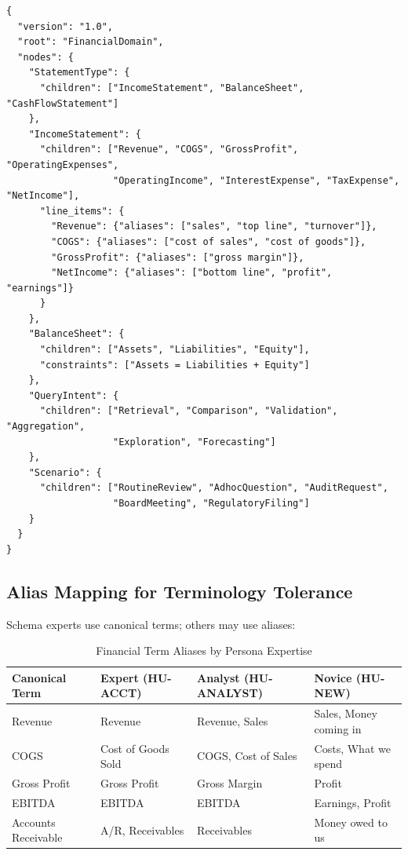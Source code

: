 \begin{lstlisting}[language=jsonx,caption={Financial domain taxonomy (JSON)}]
{
  "version": "1.0",
  "root": "FinancialDomain",
  "nodes": {
    "StatementType": {
      "children": ["IncomeStatement", "BalanceSheet", "CashFlowStatement"]
    },
    "IncomeStatement": {
      "children": ["Revenue", "COGS", "GrossProfit", "OperatingExpenses", 
                   "OperatingIncome", "InterestExpense", "TaxExpense", "NetIncome"],
      "line_items": {
        "Revenue": {"aliases": ["sales", "top line", "turnover"]},
        "COGS": {"aliases": ["cost of sales", "cost of goods"]},
        "GrossProfit": {"aliases": ["gross margin"]},
        "NetIncome": {"aliases": ["bottom line", "profit", "earnings"]}
      }
    },
    "BalanceSheet": {
      "children": ["Assets", "Liabilities", "Equity"],
      "constraints": ["Assets = Liabilities + Equity"]
    },
    "QueryIntent": {
      "children": ["Retrieval", "Comparison", "Validation", "Aggregation", 
                   "Exploration", "Forecasting"]
    },
    "Scenario": {
      "children": ["RoutineReview", "AdhocQuestion", "AuditRequest", 
                   "BoardMeeting", "RegulatoryFiling"]
    }
  }
}
\end{lstlisting}

\subsection{Alias Mapping for Terminology Tolerance}

Schema experts use canonical terms; others may use aliases:

\begin{table}[htbp]
\centering
\footnotesize
\caption{Financial Term Aliases by Persona Expertise}
\label{tab:term-aliases}
\begin{tabularx}{\textwidth}{@{}l l l l@{}}
\toprule
\textbf{Canonical Term} & \textbf{Expert (HU-ACCT)} & \textbf{Analyst (HU-ANALYST)} & \textbf{Novice (HU-NEW)} \\
\midrule
Revenue & Revenue & Revenue, Sales & Sales, Money coming in \\
COGS & Cost of Goods Sold & COGS, Cost of Sales & Costs, What we spend \\
Gross Profit & Gross Profit & Gross Margin & Profit \\
EBITDA & EBITDA & EBITDA & Earnings, Profit \\
Accounts Receivable & A/R, Receivables & Receivables & Money owed to us \\
\bottomrule
\end{tabularx}
\end{table}

